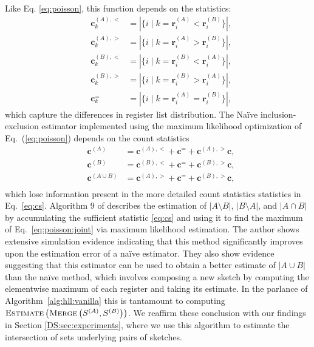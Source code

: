 \documentclass[10]{article}
\newcommand{\algoname}[1]{\textnormal{\textsc{#1}}}
\begin{document}
%
Like Eq. \eqref{eq:poisson}, this function depends on the statistics:
%
\begin{equation} \label{eq:cs}
	\begin{alignedat}{2}
		&\mathbf{c}^{(A),<}_k &= |\{i \mid k = \mathbf{r}^{(A)}_i < \mathbf{r}^{(B)}_i \}|, \\
		&\mathbf{c}^{(A),>}_k &= |\{i \mid k = \mathbf{r}^{(A)}_i > \mathbf{r}^{(B)}_i \}|, \\
		&\mathbf{c}^{(B),<}_k &= |\{i \mid k = \mathbf{r}^{(B)}_i < \mathbf{r}^{(A)}_i \}|, \\ 
		&\mathbf{c}^{(B),>}_k &= |\{i \mid k = \mathbf{r}^{(B)}_i > \mathbf{r}^{(A)}_i \}|, \\
		&\mathbf{c}^{=}_k &= |\{i \mid k = \mathbf{r}^{(A)}_i = \mathbf{r}^{(B)}_i \}|,
  \end{alignedat}
\end{equation} 
%
which capture the differences in register list distribution.
The Na\"ive inclusion-exclusion estimator implemented using the maximum likelihood optimization of Eq.~(\ref{eq:poisson}) depends on the count statistics %
\begin{equation} \label{eq:naivecs}
	\begin{alignedat}{2}
		&\mathbf{c}^{(A)} &= \mathbf{c}^{(A),<} + \mathbf{c}^= + \mathbf{c}^{(A),>}\mathbf{c}, \\
		&\mathbf{c}^{(B)} &= \mathbf{c}^{(B),<} + \mathbf{c}^= + \mathbf{c}^{(B),>}\mathbf{c}, \\
		&\mathbf{c}^{(A \cup B)} &= \mathbf{c}^{(A),>} + \mathbf{c}^= + \mathbf{c}^{(B),>}\mathbf{c}, \\
  \end{alignedat}
\end{equation} 
%
which lose information present in the more detailed count statistics statistics in Eq.~\eqref{eq:cs}.
Algorithm 9 of \cite{ertl2017new} describes the estimation of $|A \setminus B|$, $|B \setminus A|$, and $|A \cap B|$ by accumulating the sufficient statistic \eqref{eq:cs} and using it to find the maximum of Eq.~\eqref{eq:poisson:joint} via maximum likelihood estimation.
The author shows extensive simulation evidence indicating that this method significantly improves upon the estimation error of a na\"ive estimator.
They also show evidence suggesting that this estimator can be used to obtain a better estimate of $|A \cup B|$ than the na\"ive method, which involves composing a new sketch by computing the elementwise maximum of each register and taking its estimate.
In the parlance of Algorithm~\ref{alg:hll:vanilla} this is tantamount to computing $\algoname{Estimate} \left ( \algoname{Merge} \left ( S^{(A)}, S^{(B)} \right ) \right )$. 
We reaffirm these conclusion with our findings in Section \ref{DS:sec:experiments}, where we use this algorithm to estimate the intersection of sets underlying pairs of sketches.
\end{document}
